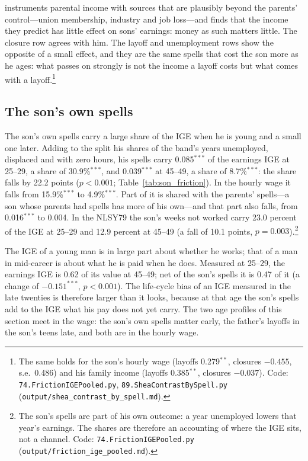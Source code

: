 

\citet{shea2000does} instruments parental income with sources that are plausibly beyond the parents' control---union
membership, industry and job loss---and finds that the income they predict has little effect on sons' earnings: money as
such matters little. The closure row agrees with him. The layoff and unemployment rows show the opposite of a small effect,
and they are the same spells that cost the son more as he ages: what passes on strongly is not the income a layoff
costs but what comes with a layoff.\footnote{The same holds for the son's hourly wage (layoffs 0.279$^{**}$, closures
$-0.455$, s.e.\ 0.486) and his family income (layoffs 0.385$^{**}$, closures $-0.037$). Code:
\texttt{74.FrictionIGEPooled.py}, \texttt{89.SheaContrastBySpell.py} (\texttt{output/shea\_contrast\_by\_spell.md}).}

\subsection{The son's own spells}

The son's own spells carry a large share of the IGE when he is young and a small one later. Adding to the split his
shares of the band's years unemployed, displaced and with zero hours, his spells carry 0.085$^{***}$ of the earnings IGE
at 25--29, a share of 30.9\%$^{***}$, and 0.039$^{***}$ at 45--49, a share of 8.7\%$^{***}$: the share falls by 22.2
points ($p<0.001$; Table~\ref{tab:son_friction}). In the hourly wage it falls from 15.9\%$^{***}$ to 4.9\%$^{***}$. Part
of it is shared with the parents' spells---a son whose parents had spells has more of his own---and that part also
falls, from 0.016$^{***}$ to 0.004. In the NLSY79 the son's weeks not worked carry 23.0 percent of the IGE at 25--29 and
12.9 percent at 45--49 (a fall of 10.1 points, $p = 0.003$).\footnote{The son's spells are part of his own outcome: a year
unemployed lowers that year's earnings. The shares are therefore an accounting of where the IGE sits, not a channel.
Code: \texttt{74.FrictionIGEPooled.py} (\texttt{output/friction\_ige\_pooled.md}).}



The IGE of a young man is in large part about whether he works; that of a man in mid-career is about what he is paid
when he does. Measured at 25--29, the earnings IGE is 0.62 of its value at 45--49; net of the son's spells it is
0.47 of it (a change of $-0.151^{***}$, $p<0.001$). The life-cycle bias of an IGE measured in the late twenties is
therefore larger than it looks, because at that age the son's spells add to the IGE what his pay does not yet carry. The two age profiles of this section meet in the wage: the son's own spells matter early, the father's
layoffs in the son's teens late, and both are in the hourly wage.

